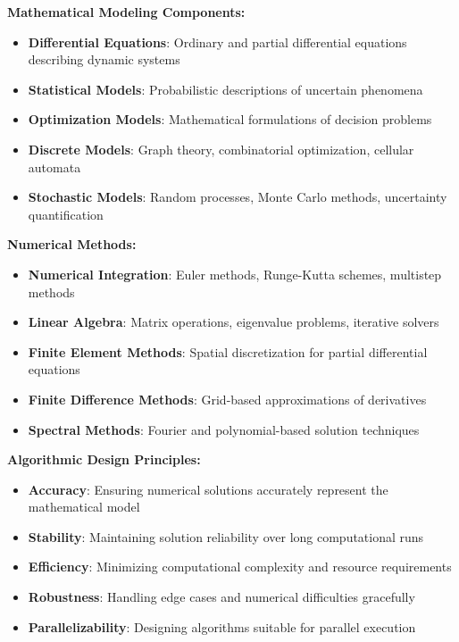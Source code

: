 \textbf{Mathematical Modeling Components:}
\begin{itemize}
    \item \textbf{Differential Equations}: Ordinary and partial differential equations describing dynamic systems
    \item \textbf{Statistical Models}: Probabilistic descriptions of uncertain phenomena
    \item \textbf{Optimization Models}: Mathematical formulations of decision problems
    \item \textbf{Discrete Models}: Graph theory, combinatorial optimization, cellular automata
    \item \textbf{Stochastic Models}: Random processes, Monte Carlo methods, uncertainty quantification
\end{itemize}

\textbf{Numerical Methods:}
\begin{itemize}
    \item \textbf{Numerical Integration}: Euler methods, Runge-Kutta schemes, multistep methods
    \item \textbf{Linear Algebra}: Matrix operations, eigenvalue problems, iterative solvers
    \item \textbf{Finite Element Methods}: Spatial discretization for partial differential equations
    \item \textbf{Finite Difference Methods}: Grid-based approximations of derivatives
    \item \textbf{Spectral Methods}: Fourier and polynomial-based solution techniques
\end{itemize}

\textbf{Algorithmic Design Principles:}
\begin{itemize}
    \item \textbf{Accuracy}: Ensuring numerical solutions accurately represent the mathematical model
    \item \textbf{Stability}: Maintaining solution reliability over long computational runs
    \item \textbf{Efficiency}: Minimizing computational complexity and resource requirements
    \item \textbf{Robustness}: Handling edge cases and numerical difficulties gracefully
    \item \textbf{Parallelizability}: Designing algorithms suitable for parallel execution
\end{itemize}

